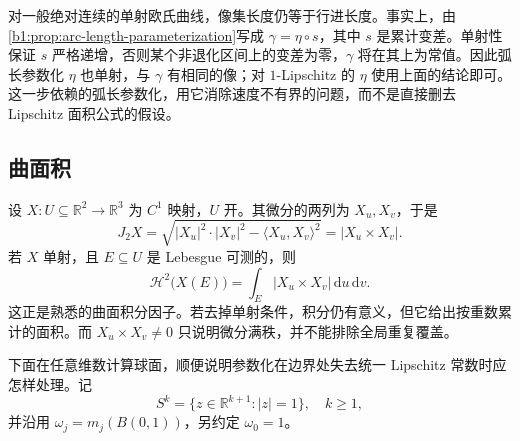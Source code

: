 \ProseParagraphBreak

对一般绝对连续的单射欧氏曲线，像集长度仍等于行进长度。事实上，由\cref{b1:prop:arc-length-parameterization}写成 \(\gamma=\eta\circ s\)，其中 \(s\) 是累计变差。单射性保证 \(s\) 严格递增，否则某个非退化区间上的变差为零，\(\gamma\) 将在其上为常值。因此弧长参数化 \(\eta\) 也单射，与 \(\gamma\) 有相同的像；对 \(1\)-Lipschitz 的 \(\eta\) 使用上面的结论即可。这一步依赖的弧长参数化，用它消除速度不有界的问题，而不是直接删去 Lipschitz 面积公式的假设。

\subsection{曲面积}
\label{b1:subsec:170402}

设 \(X:U\subseteq\mathbb R^2\to\mathbb R^3\) 为 \(C^1\) 映射，\(U\) 开。其微分的两列为 \(X_u,X_v\)，于是
\[
 J_2X=\sqrt{|X_u|^2\cdot|X_v|^2-\langle X_u,X_v\rangle^2}
      =|X_u\times X_v|.
\]
若 \(X\) 单射，且 \(E\subseteq U\) 是 Lebesgue 可测的，则
\[
 \mathcal H^2\bigl(X(E)\bigr)
 =\int_E|X_u\times X_v|\,\mathrm du\,\mathrm dv.
\]
这正是熟悉的曲面积分因子。若去掉单射条件，积分仍有意义，但它给出按重数累计的面积。而 \(X_u\times X_v\ne0\) 只说明微分满秩，并不能排除全局重复覆盖。

\ProseParagraphBreak

下面在任意维数计算球面，顺便说明参数化在边界处失去统一 Lipschitz 常数时应怎样处理。记
\[
 S^k=\{z\in\mathbb R^{k+1}:|z|=1\},\quad k\geq1,
\]
并沿用 \(\omega_j=m_j(B(0,1))\)，另约定 \(\omega_0=1\)。


